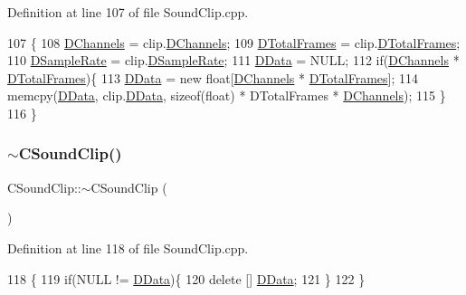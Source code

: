Definition at line 107 of file Sound\+Clip.\+cpp.


\begin{DoxyCode}
107                                             \{
108     \hyperlink{classCSoundClip_a01aaf0b87b9b8226c77a6931d03d6a64}{DChannels} = clip.\hyperlink{classCSoundClip_a01aaf0b87b9b8226c77a6931d03d6a64}{DChannels};
109     \hyperlink{classCSoundClip_ab0d9eb261d09fa2a106658276f37285b}{DTotalFrames} = clip.\hyperlink{classCSoundClip_ab0d9eb261d09fa2a106658276f37285b}{DTotalFrames};
110     \hyperlink{classCSoundClip_ac1b9306140da2f89f6178833e0a9b887}{DSampleRate} = clip.\hyperlink{classCSoundClip_ac1b9306140da2f89f6178833e0a9b887}{DSampleRate};
111     \hyperlink{classCSoundClip_a220921a0c81e5c63e2cd3c55c75878b1}{DData} = NULL;
112     \textcolor{keywordflow}{if}(\hyperlink{classCSoundClip_a01aaf0b87b9b8226c77a6931d03d6a64}{DChannels} * \hyperlink{classCSoundClip_ab0d9eb261d09fa2a106658276f37285b}{DTotalFrames})\{
113         \hyperlink{classCSoundClip_a220921a0c81e5c63e2cd3c55c75878b1}{DData} = \textcolor{keyword}{new} \textcolor{keywordtype}{float}[\hyperlink{classCSoundClip_a01aaf0b87b9b8226c77a6931d03d6a64}{DChannels} * \hyperlink{classCSoundClip_ab0d9eb261d09fa2a106658276f37285b}{DTotalFrames}];
114         memcpy(\hyperlink{classCSoundClip_a220921a0c81e5c63e2cd3c55c75878b1}{DData}, clip.\hyperlink{classCSoundClip_a220921a0c81e5c63e2cd3c55c75878b1}{DData}, \textcolor{keyword}{sizeof}(\textcolor{keywordtype}{float}) * DTotalFrames * 
      \hyperlink{classCSoundClip_a01aaf0b87b9b8226c77a6931d03d6a64}{DChannels});
115     \}
116 \}
\end{DoxyCode}
\hypertarget{classCSoundClip_a9c1ae390d4509c4d39610a624c2f61f5}{}\label{classCSoundClip_a9c1ae390d4509c4d39610a624c2f61f5} 
\subsubsection{\texorpdfstring{$\sim$\+C\+Sound\+Clip()}{~CSoundClip()}}
{\footnotesize\ttfamily C\+Sound\+Clip\+::$\sim$\+C\+Sound\+Clip (\begin{DoxyParamCaption}{ }\end{DoxyParamCaption})}



Definition at line 118 of file Sound\+Clip.\+cpp.


\begin{DoxyCode}
118                        \{
119     \textcolor{keywordflow}{if}(NULL != \hyperlink{classCSoundClip_a220921a0c81e5c63e2cd3c55c75878b1}{DData})\{
120         \textcolor{keyword}{delete} [] \hyperlink{classCSoundClip_a220921a0c81e5c63e2cd3c55c75878b1}{DData};   
121     \}
122 \}
\end{DoxyCode}


